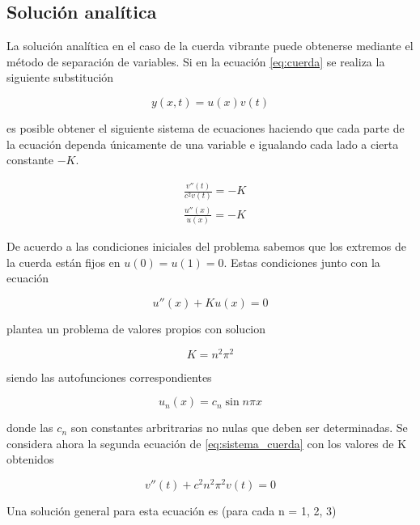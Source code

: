 \documentclass[11pt]{article}
\begin{document}
\subsection{Solución analítica}
\label{sec:sol_analitica}
La solución analítica en el caso de la cuerda vibrante puede obtenerse mediante el método
de separación de variables. Si en la ecuación \ref{eq:cuerda} se realiza la siguiente
substitución

\begin{equation}
y(x,t) = u(x)v(t)
\end{equation}

es posible obtener el siguiente sistema de ecuaciones haciendo que cada parte de la ecuación
dependa únicamente de una variable e igualando cada lado a cierta constante $-K$.

\begin{subequations}
\begin{flalign}
	&\frac{v''(t)}{c^2v(t)} = -K\\
	&\frac{u''(x)}{u(x)} = -K
\end{flalign}
\label{eq:sistema_cuerda}
\end{subequations}

De acuerdo a las condiciones iniciales del problema sabemos que los extremos de la cuerda
están fijos en $u(0) = u(1) = 0$. Estas condiciones junto con la ecuación

\begin{equation}
	u''(x) + Ku(x) = 0
\end{equation}

plantea un problema de valores propios con solucion

\begin{equation}
	K = n^2\pi^2
\end{equation}

siendo las autofunciones correspondientes

\begin{equation}
	u_n(x) = c_n\sin{n\pi{x}}
\end{equation}

donde las $c_n$ son constantes arbritrarias no nulas que deben ser determinadas.
Se considera ahora la segunda ecuación de \ref{eq:sistema_cuerda} con los valores de K
obtenidos

\begin{equation}
	v''(t) + c^2n^2\pi^2v(t) = 0
\end{equation}
 
Una solución general para esta ecuación es (para cada n = 1, 2, 3)
\end{document}
